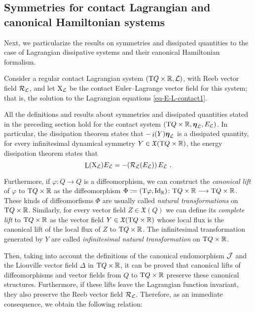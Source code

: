 \documentclass[12pt]{report}
\def\beq{\begin{equation}}
\def\eeq{\end{equation}}
\def\vf{\mathfrak X}
\def\Lag{{\cal L}}
\def\Real{\mathbb{R}}
\def\bmeta{\mbox{\boldmath $\eta$}}
\def\X{{\rm X}}
\def\Tan{{\rm T}}
\def\Lie{\mathop{\rm L}\nolimits}
\def\inn{\mathop{i}\nolimits}
\newcommand{\Reeb}{\mathcal{R}}
\begin{document}
\subsection{Symmetries for contact Lagrangian and canonical Hamiltonian systems}


Next, we particularize the results on symmetries and dissipated quantities 
to the case of Lagrangian dissipative systems and their canonical Hamiltonian formalism.

Consider a regular contact Lagrangian system $(\Tan Q\times\Real,\Lag)$, 
with Reeb vector field $\Reeb_\Lag$,
and let $\X_\Lag$ be the contact Euler--Lagrange vector field for this system;
that is, the solution to the Lagrangian equations \eqref{eq-E-L-contact1}.

All the definitions and results about symmetries and dissipated quantities stated in the preceding section 
hold for the contact system $(\Tan Q\times\Real,\bmeta_\Lag,E_\Lag)$.
In particular, the dissipation theorem states that
$-\inn(Y)\bmeta_\Lag$ is a dissipated quantity, for every infinitesimal dynamical symmetry $Y\in\vf(\Tan Q\times\Real)$,
the energy dissipation theorem states that
\beq
\label{energdis}
\Lie(\X_\Lag)E_\Lag=-(\Reeb_\Lag(E_\Lag))\,E_\Lag\ .
\eeq

Furthermore,
if $\varphi\colon Q\to Q$ is a diffeomorphism,
we can construct the {\sl canonical lift} of $\varphi$ to $\Tan Q\times\Real$ as the diffeomorphism 
$\Phi:=(\Tan\varphi, {\rm {\rm Id}_{\mathbb R}}) \colon
\Tan Q\times\Real
\longrightarrow 
\Tan Q\times\Real$.
These kinds of diffeomorfisms $\Phi$ are usually called {\sl natural transformations} on $\Tan Q\times\Real$.
Similarly, for every vector field $Z\in \vf(Q)$
we can define its {\sl complete lift}
to $\Tan Q\times\Real$ as the vector field
$Y\in\vf(\Tan Q\times\Real)$
whose local flux is the canonical lift of 
the local flux of $Z$ to $\Tan Q\times\Real$.
The infinitesimal transformation generated by $Y$ are called {\sl infinitesimal natural transformation} 
on $\Tan Q\times\Real$.

Then, taking into account the definitions
of the canonical endomorphism ${\cal J}$
and the Liouville vector field $\Delta$ in $\Tan Q\times\Real$,
it can be proved that canonical lifts of diffeomorphisms and vector fields
from $Q$ to $\Tan Q\times\Real$ preserve these canonical structures.
Furthermore, if these lifts leave the Lagrangian function invariant,
they also preserve the Reeb vector field $\Reeb_\Lag$.
Therefore, as an immediate consequence, 
we obtain the following relation:
\end{document}
